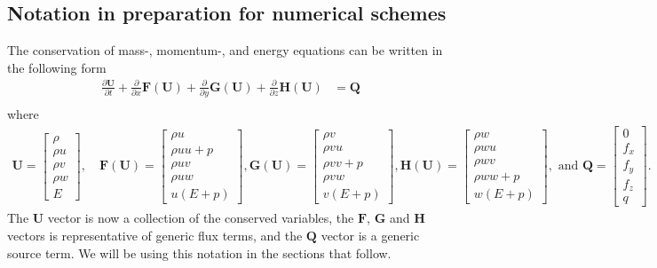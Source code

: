 \documentclass[10pt,letterpaper,notitlepage]{article}
\numberwithin{equation}{section}
\newcommand{\partialderiv}[2]{\frac{\partial #1}{\partial #2}}
\newcommand{\beqn}{\begin{equation}\begin{aligned}}
\newcommand{\eeqn}{\end{aligned}\end{equation}}
\begin{document}
\vspace{1cm}
\subsection{Notation in preparation for numerical schemes}
The conservation of mass-, momentum-, and energy equations can be written in the following form
\beqn \label{eq:euler_operator_form}
\partialderiv{\mathbf{U}}{t} + 
\partialderiv{}{x}\mathbf{F}(\mathbf{U}) +
\partialderiv{}{y}\mathbf{G}(\mathbf{U}) +
\partialderiv{}{z}\mathbf{H}(\mathbf{U}) 
&= 
 \mathbf{Q} \\
\eeqn 
where
\beqn \label{eq:definitions_UFHGQ}
\mathbf{U} = 
\begin{bmatrix}
\rho \\ 
\rho u \\
\rho v \\
\rho w \\ 
E
\end{bmatrix}
, \quad 
\mathbf{F}(\mathbf{U})=
\begin{bmatrix}
\rho u \\
\rho uu + p\\
\rho uv \\
\rho uw \\
u(E+p)
\end{bmatrix}
,
\mathbf{G}(\mathbf{U})=
\begin{bmatrix}
\rho v \\
\rho v u \\
\rho vv + p \\
\rho vw \\
v(E+p)
\end{bmatrix}
,
\mathbf{H}(\mathbf{U})=
\begin{bmatrix}
\rho w \\
\rho wu \\
\rho wv \\
\rho ww + p \\
w(E+p)
\end{bmatrix}
, \text{ and }
\mathbf{Q} = 
\begin{bmatrix}
0 \\
f_x \\
f_y \\
f_z \\
q
\end{bmatrix}.
\eeqn 
The $\mathbf{U}$ vector is now a collection of the conserved variables, 
the $\mathbf{F}$, $\mathbf{G}$ and $\mathbf{H}$ vectors is representative of generic flux terms, and the $\mathbf{Q}$ vector is a generic source term. We will be using this notation in the sections that follow.
\end{document}
